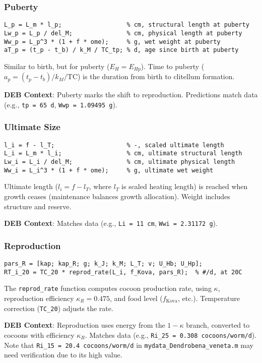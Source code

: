 \documentclass[11pt]{article}
\begin{document}
\subsubsection{Puberty}
\begin{verbatim}
L_p = L_m * l_p;                  % cm, structural length at puberty
Lw_p = L_p / del_M;               % cm, physical length at puberty
Ww_p = L_p^3 * (1 + f * ome);     % g, wet weight at puberty
aT_p = (t_p - t_b) / k_M / TC_tp; % d, age since birth at puberty
\end{verbatim}
Similar to birth, but for puberty ($E_H = E_{Hp}$). Time to puberty ($a_p = (t_p - t_b) / k_M / \text{TC}$) is the duration from birth to clitellum formation.

\textbf{DEB Context}: Puberty marks the shift to reproduction. Predictions match data (e.g., \texttt{tp = 65 d}, \texttt{Wwp = 1.09495 g}).

\subsubsection{Ultimate Size}
\begin{verbatim}
l_i = f - l_T;                    % -, scaled ultimate length
L_i = L_m * l_i;                  % cm, ultimate structural length
Lw_i = L_i / del_M;               % cm, ultimate physical length
Ww_i = L_i^3 * (1 + f * ome);     % g, ultimate wet weight
\end{verbatim}
Ultimate length ($l_i = f - l_T$, where $l_T$ is scaled heating length) is reached when growth ceases (maintenance balances growth allocation). Weight includes structure and reserve.

\textbf{DEB Context}: Matches data (e.g., \texttt{Li = 11 cm}, \texttt{Wwi = 2.31172 g}).

\subsubsection{Reproduction}
\begin{verbatim}
pars_R = [kap; kap_R; g; k_J; k_M; L_T; v; U_Hb; U_Hp];
RT_i_20 = TC_20 * reprod_rate(L_i, f_Kova, pars_R);  % #/d, at 20C
\end{verbatim}
The \texttt{reprod\_rate} function computes cocoon production rate, using $\kappa$, reproduction efficiency $\kappa_R = 0.475$, and food level ($f_{\text{Kova}}$, etc.). Temperature correction (\texttt{TC\_20}) adjusts the rate.

\textbf{DEB Context}: Reproduction uses energy from the $1-\kappa$ branch, converted to cocoons with efficiency $\kappa_R$. Matches data (e.g., \texttt{Ri\_25 = 0.308 cocoons/worm/d}). Note that \texttt{Ri\_15 = 20.4 cocoons/worm/d} in \texttt{mydata\_Dendrobena\_veneta.m} may need verification due to its high value.
\end{document}
